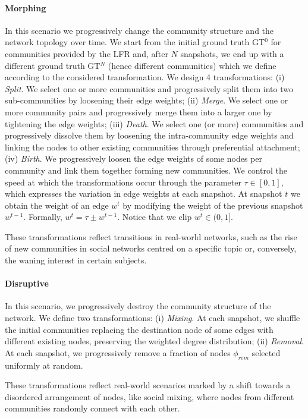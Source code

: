 \documentclass[letterpaper]{article}
\begin{document}
\paragraph*{Morphing} In this scenario we progressively change the community structure and the network topology over time. 
We start from the initial ground truth GT$^0$ for communities provided by the LFR and, after $N$ snapshots, we end up with a different ground truth GT$^N$ (hence different communities) which we define according to the considered transformation.
We design 4 transformations: (i) \emph{Split}. We select one or more communities and progressively split them into two sub-communities by loosening their edge weights; {(ii) \emph{Merge}}. We select one or more community pairs and progressively merge them into a larger one by tightening the edge weights; (iii) \emph{Death}. We select one (or more) communities and progressively dissolve them by loosening the intra-community edge weights and linking the nodes to other existing communities through preferential attachment; (iv) \emph{Birth}. We progressively loosen the edge weights of some nodes per community and link them together forming new communities. We control the speed at which the transformations occur through the parameter $\tau \in[0, 1]$, which expresses the variation in edge weights at each snapshot. At snapshot $t$ we obtain the weight of an edge $w^t$ by modifying the weight of the previous snapshot $w^{t-1}$. Formally, $w^t = \tau \pm w^{t-1}$. Notice that we clip $w^t \in (0, 1]$.

These transformations reflect transitions in real-world networks, such as the rise of new communities in social networks centred on a specific topic or, conversely, the waning interest in certain subjects. 

\paragraph*{Disruptive} 
In this scenario, we progressively destroy the community structure of the network. We define two transformations: (i) \emph{Mixing}. At each snapshot, we shuffle the initial communities replacing the destination node of some edges with different existing nodes, preserving the weighted degree distribution; (ii) \emph{Removal}. At each snapshot, we progressively remove a fraction of nodes $\phi_{rem}$ selected uniformly at random.

These transformations reflect real-world scenarios marked by a shift towards a disordered arrangement of nodes, like social mixing, where nodes from different communities randomly connect with each other.
\end{document}
